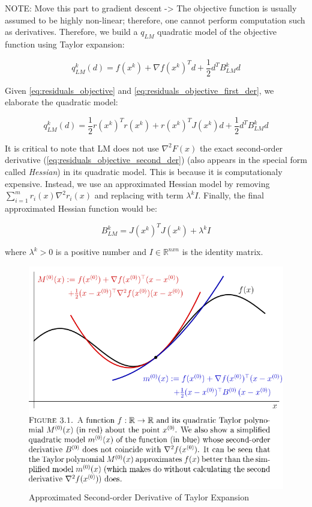 \documentclass[a4paper]{report}
\numberwithin{figure}{section}
\newcommand{\R}{\mathbb{R}}
\begin{document}
NOTE: Move this part to gradient descent ->
The objective function is usually assumed to be highly non-linear; therefore, 
one cannot perform computation such as derivatives. Therefore, we build 
a $q_{LM}$ quadratic model of the objective function using Taylor expansion:

\begin{equation}
  q_{LM}^k(d) = f(x^k) + \nabla f(x^k)^T d + \frac{1}{2} d^T B_{LM}^kd
\end{equation}

Given \ref{eq:residuals_objective} and \ref{eq:residuals_objective_first_der}, we elaborate the quadratic model:

\begin{equation}
  q_{LM}^k(d) = \frac{1}{2}r(x^k)^Tr(x^k) + r(x^k)^TJ(x^k)d + \frac{1}{2}d^TB_{LM}^kd
\end{equation}

It is critical to note that LM does not use $\nabla^2F(x)$ 
the exact second-order derivative (\ref{eq:residuals_objective_second_der})
(also appears in the special form called \textit{Hessian}) in its quadratic model. 
This is because it is computationaly expensive. Instead, we use an approximated 
Hessian model by removing $\sum_{i=1}^mr_i(x)\nabla^2r_i(x)$ and replacing with 
term $\lambda^k I$. Finally, the final approximated Hessian function would be:

\begin{equation}
  B_{LM}^k = J(x^k)^T J(x^k) + \lambda^k I
\end{equation}

where $\lambda^k>0$ is a positive number and $I\in \R^{nxn}$ is the identity matrix.

\begin{figure}[H]
	\centering
	\includegraphics[width=\linewidth,natwidth=640,natheight=640]
	{fig/ref_imgs/taylor_approx_2nd_derivative.png}
	\caption{Approximated Second-order Derivative of Taylor Expansion}
  \label{fig:taylor_approx_2nd_derivative}
\end{figure}
\end{document}
